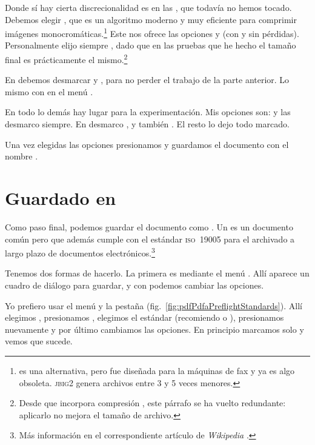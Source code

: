 \documentclass[%
	a5paper,
	10pt,
	twoside,
	openright,
	final,
]{memoir}
\begin{document}
{	Donde sí hay cierta discrecionalidad es en las , que todavía no hemos tocado. Debemos elegir , que es un algoritmo moderno y muy eficiente para comprimir imágenes monocromáticas.\footnote{ es una alternativa, pero fue diseñada para la máquinas de fax y ya es algo obsoleta. \textsc{jbig2} genera archivos entre 3 y 5 veces menores.} Este nos ofrece las opciones  y  (con y sin pérdidas). Personalmente elijo siempre , dado que en las pruebas que he hecho el tamaño final es prácticamente el mismo.\footnote{Desde que \abbyy incorpora compresión \jbig, este párrafo se ha vuelto redundante: aplicarlo no mejora el tamaño de archivo.}

	En  debemos desmarcar  y , para no perder el trabajo de la parte anterior. Lo mismo con  en el menú .

	En todo lo demás hay lugar para la experimentación. Mis opciones son:  y  las desmarco siempre. En  desmarco ,  y también . El resto lo dejo todo marcado.

	Una vez elegidas las opciones presionamos  y guardamos el documento con el nombre .

	\section{Guardado en \texorpdfstring{\pdfa{}}{PDF/A}} Como paso final, podemos guardar el documento como \pdfa. Un \pdfa es un documento \pdf común pero que además cumple con el estándar \textsc{iso~19005} para el archivado a largo plazo de documentos electrónicos.\footnote{Más información en el correspondiente artículo de \emph{Wikipedia} \cite{WikipediaPDFA}.}

	Tenemos dos formas de hacerlo. La primera es mediante el menú . Allí aparece un cuadro de diálogo para guardar, y con  podemos cambiar las opciones.

	Yo prefiero usar el menú  y la pestaña  (fig.~\ref{fig:pdfPdfaPreflightStandards}). Allí elegimos , presionamos , elegimos el estándar (recomiendo  o ), presionamos  nuevamente y por último cambiamos las opciones. En principio marcamos solo  y vemos que sucede.

}
\end{document}
